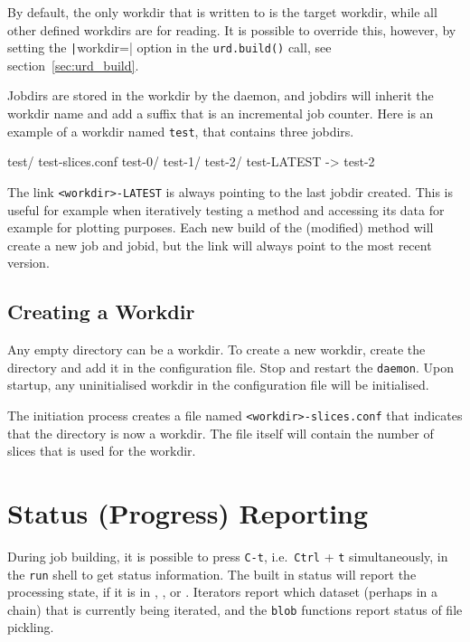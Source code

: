 By default, the only workdir that is written to is the target workdir,
while all other defined workdirs are for reading.  It is possible to
override this, however, by setting the \texttt|workdir=|
option in the \texttt{urd.build()} call, see
section~\ref{sec:urd_build}.

Jobdirs are stored in the workdir by the daemon, and jobdirs will
inherit the workdir name and add a suffix that is an incremental job
counter.  Here is an example of a workdir named \texttt{test}, that
contains three jobdirs.
\begin{shell}
test/
    test-slices.conf
    test-0/
    test-1/
    test-2/
    test-LATEST -> test-2
\end{shell}
The link \texttt{<workdir>-LATEST} is always pointing to the last
jobdir created.  This is useful for example when iteratively testing a
method and accessing its data for example for plotting purposes.  Each
new build of the (modified) method will create a new job and jobid,
but the link will always point to the most recent version.


\subsection{Creating a Workdir}
Any empty directory can be a workdir.  To create a new workdir, create
the directory and add it in the configuration file.  Stop and restart
the \texttt{daemon}.  Upon startup, any uninitialised workdir in the
configuration file will be initialised.

The initiation process creates a file named
\texttt{<workdir>-slices.conf} that indicates that the directory is
now a workdir.  The file itself will contain the number of slices that
is used for the workdir.







\section{Status (Progress) Reporting}

During job building, it is possible to press \texttt{C-t},
i.e.\ \texttt{Ctrl} + \texttt{t} simultaneously, in the \texttt{run}
shell to get status information.  The built in status will report the
processing state, if it is in \prepare, \analysis, or \synthesis.
Iterators report which dataset (perhaps in a chain) that is currently
being iterated, and the \texttt{blob} functions report status of file
pickling.

